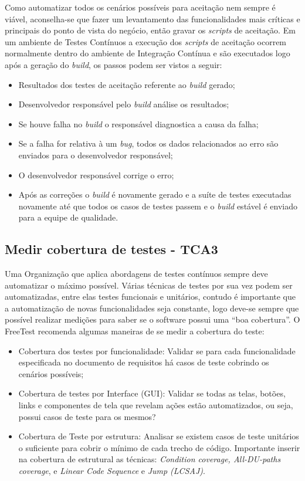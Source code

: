 Como automatizar todos os cenários possíveis para aceitação nem sempre é viável, aconselha-se que fazer um levantamento das funcionalidades mais críticas e principais do ponto de vista do negócio, então gravar os \textit{scripts} de aceitação. Em um ambiente de Testes Contínuos a execução dos \textit{scripts} de aceitação ocorrem normalmente dentro do ambiente de Integração Contínua e são executados logo após a geração do \textit{build}, os passos podem ser vistos a seguir:

\begin{itemize}
	\item Resultados dos testes de aceitação referente ao \textit{build} gerado;
	\item Desenvolvedor responsável pelo \textit{build} análise os resultados;
	\item Se houve falha no \textit{build} o responsável diagnostica a causa da falha;
	\item Se a falha for relativa à um \textit{bug}, todos os dados relacionados ao erro são enviados para o desenvolvedor responsável;
	\item O desenvolvedor responsável corrige o erro;
	\item Após as correções o \textit{build} é novamente gerado e a suíte de testes executadas novamente até que todos os casos de testes passem e o \textit{build} estável é enviado para a equipe de qualidade.
\end{itemize}

\subsection{Medir cobertura de testes - TCA3}
\label{sec:guiatca3}

Uma Organização que aplica abordagens de testes contínuos sempre deve automatizar o máximo possível. Várias técnicas de testes por sua vez podem ser automatizadas, entre elas testes funcionais e unitários, contudo é importante que a automatização de novas funcionalidades seja constante, logo deve-se sempre que possível realizar medições para saber se o software possui uma “boa cobertura”. O FreeTest recomenda algumas maneiras de se medir a cobertura do teste:

\begin{itemize}
    \item Cobertura dos testes por funcionalidade: Validar se para cada funcionalidade especificada no documento de requisitos há casos de teste cobrindo os cenários possíveis;
    \item Cobertura de testes por Interface (GUI): Validar se todas as telas, botões, links e componentes de tela que revelam ações estão automatizados, ou seja, possui casos de teste para os mesmos?
    \item Cobertura de Teste por estrutura: Analisar se existem casos de teste unitários o suficiente para cobrir o mínimo de cada trecho de código. Importante inserir na cobertura de estrutural as técnicas: \textit{Condition coverage, All-DU-paths coverage}, e \textit{Linear Code Sequence} e \textit{Jump (LCSAJ)}.

\end{itemize}

